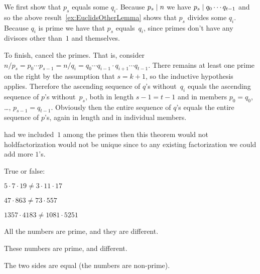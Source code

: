 \documentclass{ibl}  %
\begin{document}
\begin{problem}
\begin{exes}
\begin{answer}
  We first show that $p_s$ equals some $q_i$.
  Because $p_s\mid n$ we have $p_s\mid q_0\cdots q_{t-1}$ and so
  the above result~\ref{ex:EuclidsOtherLemma} shows that
  $p_s$ divides some $q_i$.
  Because $q_i$ is prime we have that $p_s$ equals~$q_i$,
  since primes don't have any divisors other than~$1$ and themselves.

  To finish, cancel the primes.
  That is, consider 
  $n/p_s=p_0\cdots p_{s-1}=n/q_i=q_0\cdots q_{i-1}\cdot q_{i+1}\cdots q_{t-1}$.
  There remains at least one prime on the right by the assumption that 
  $s=k+1$, so the inductive hypothesis applies. 
  Therefore
  the ascending sequence of $q$'s without~$q_i$ 
  equals the ascending sequence of $p$'s without~$p_s$,
  both in length $s-1=t-1$ and in members 
  $p_0=q_0$, \ldots, $p_{s-1}=q_{t-1}$. 
  Obviously then the entire sequence of $q$'s equals the entire sequence of
  $p$'s, again in length and in individual members.   
\end{answer}
\end{exes}
\end{problem}

\noindent\remark had we
included~$1$ among the primes then this theorem would not
hold\Dash factorization would not be unique\Dash 
since to any existing factorization we could add more $1$'s.

\begin{problem}[\midlength] 
True or false:
\begin{items}
\item $5\cdot 7\cdot 19\neq 3\cdot 11\cdot 17$
\item $47\cdot 863\neq 73\cdot 557$
\item $1357\cdot 4183\neq 1081\cdot 5251$ %
\end{items}
\begin{answer}
\begin{items}
\item All the numbers are prime, and they are different.
\item These numbers are prime, and different.
\item The two sides are equal (the numbers are non-prime).     
\end{items}
\end{answer}
\end{problem}

\end{document}
